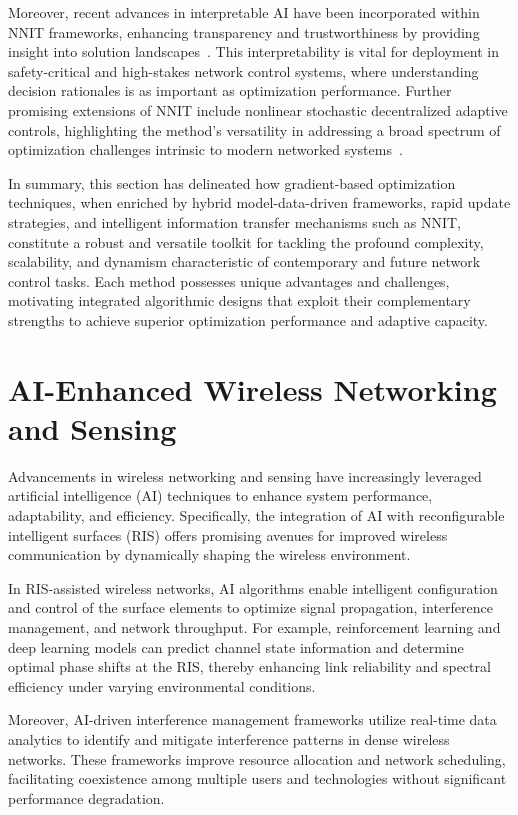 \documentclass[sigconf]{acmart}
\begin{document}
Moreover, recent advances in interpretable AI have been incorporated within NNIT frameworks, enhancing transparency and trustworthiness by providing insight into solution landscapes~\cite{ref39}. This interpretability is vital for deployment in safety-critical and high-stakes network control systems, where understanding decision rationales is as important as optimization performance. Further promising extensions of NNIT include nonlinear stochastic decentralized adaptive controls, highlighting the method's versatility in addressing a broad spectrum of optimization challenges intrinsic to modern networked systems~\cite{ref40}.

In summary, this section has delineated how gradient-based optimization techniques, when enriched by hybrid model-data-driven frameworks, rapid update strategies, and intelligent information transfer mechanisms such as NNIT, constitute a robust and versatile toolkit for tackling the profound complexity, scalability, and dynamism characteristic of contemporary and future network control tasks. Each method possesses unique advantages and challenges, motivating integrated algorithmic designs that exploit their complementary strengths to achieve superior optimization performance and adaptive capacity.

\section{AI-Enhanced Wireless Networking and Sensing}

Advancements in wireless networking and sensing have increasingly leveraged artificial intelligence (AI) techniques to enhance system performance, adaptability, and efficiency. Specifically, the integration of AI with reconfigurable intelligent surfaces (RIS) offers promising avenues for improved wireless communication by dynamically shaping the wireless environment.

In RIS-assisted wireless networks, AI algorithms enable intelligent configuration and control of the surface elements to optimize signal propagation, interference management, and network throughput. For example, reinforcement learning and deep learning models can predict channel state information and determine optimal phase shifts at the RIS, thereby enhancing link reliability and spectral efficiency under varying environmental conditions.

Moreover, AI-driven interference management frameworks utilize real-time data analytics to identify and mitigate interference patterns in dense wireless networks. These frameworks improve resource allocation and network scheduling, facilitating coexistence among multiple users and technologies without significant performance degradation.
\end{document}
